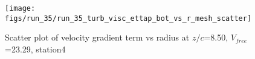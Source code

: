 \begin{figure}[H]
\centering
\texttt{[image: figs/run\_35/run\_35\_turb\_visc\_ettap\_bot\_vs\_r\_mesh\_scatter]}
\caption{Scatter plot of velocity gradient term vs radius at $z/c$=8.50, $V_{free}$=23.29, station4}
\label{fig:run_35_turb_visc_ettap_bot_vs_r_mesh_scatter}
\end{figure}


